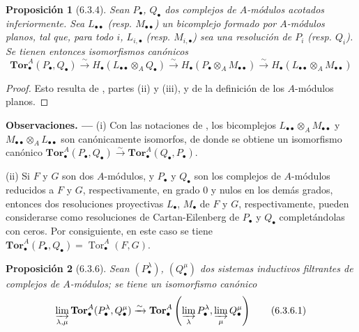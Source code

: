 \documentclass[10pt,oneside,openany]{book}
\makeatletter
\theoremstyle{egaenv}\newtheorem*{env}{---}
\theoremstyle{egastatement}
\newtheorem*{proposition}{Proposición}
\theoremstyle{egadescription}
\newenvironment{namedtheorem}[2][]{\par\medskip\noindent\setmanualcurrentlabel{#1}\textbf{#2\ifstrempty{#1}{}{ (#1)}. ---}\ifstrequal{#2}{Observación}{\normalfont}{\ifstrequal{#2}{Observaciones}{\normalfont}{\itshape}}}{\par\medskip}
\newcommand{\setmanualcurrentlabel}[1]{\def\@currentlabel{#1}}
\makeatother
\begin{document}
\begin{proposition}[6.3.4]
\label{III.6.3.4}
Sean $P_\bullet$, $Q_\bullet$ dos complejos de $A$-módulos acotados
inferiormente. Sea $L_{\bullet\bullet}$ \textup{(resp. $M_{\bullet\bullet}$)} un
bicomplejo formado por $A$-módulos planos, tal que, para todo $i$,
$L_{i,\bullet}$ \textup{(resp. $M_{i,\bullet}$)} sea una resolución de $P_i$
\textup{(resp. $Q_i$)}. Se tienen entonces isomorfismos canónicos
\[
  \mathbf{Tor}_\bullet^A(P_\bullet,Q_\bullet)
  \xrightarrow{\sim}H_\bullet(L_{\bullet\bullet}\otimes_AQ_\bullet)
  \xrightarrow{\sim}H_\bullet(P_\bullet\otimes_AM_{\bullet\bullet})
  \xrightarrow{\sim}H_\bullet(L_{\bullet\bullet}\otimes_AM_{\bullet\bullet})
  \tag{6.3.4.1}\label{III.6.3.4.1.fr}
\]
\end{proposition}

\begin{proof}
Esto resulta de , partes (ii) y (iii), y de la definición
de los
$A$-módulos planos.
\end{proof}

\begin{namedtheorem}[6.3.5]{Observaciones}
\label{III.6.3.5}
(i) Con las notaciones de , los bicomplejos
$L_{\bullet\bullet}\otimes_A M_{\bullet\bullet}$ y
$M_{\bullet\bullet}\otimes_A L_{\bullet\bullet}$ son canónicamente
isomorfos, de donde se obtiene un isomorfismo canónico
$\mathbf{Tor}_\bullet^A(P_\bullet,Q_\bullet)\xrightarrow{\sim}
\mathbf{Tor}_\bullet^A(Q_\bullet,P_\bullet)$.

(ii) Si $F$ y $G$ son dos $A$-módulos, y $P_\bullet$ y $Q_\bullet$ son los
complejos de $A$-módulos reducidos a $F$ y $G$, respectivamente, en grado 0 y
nulos en los demás grados, entonces dos resoluciones proyectivas $L_\bullet$,
$M_\bullet$ de $F$ y $G$, respectivamente, pueden considerarse como
resoluciones de Cartan-Eilenberg de $P_\bullet$ y $Q_\bullet$ completándolas
con ceros. Por consiguiente, en este caso se tiene
$\mathbf{Tor}_\bullet^A(P_\bullet,Q_\bullet)
=\operatorname{Tor}_\bullet^A(F,G)$.
\end{namedtheorem}

\begin{proposition}[6.3.6]
\label{III.6.3.6}
Sean $(P_\bullet^\lambda)$, $(Q_\bullet^\mu)$ dos sistemas inductivos
filtrantes de complejos de $A$-módulos; se tiene un isomorfismo canónico
\[
  \varinjlim_{\lambda,\mu}
  \mathbf{Tor}_\bullet^A(P_\bullet^\lambda,Q_\bullet^\mu)
  \xrightarrow{\sim}
  \mathbf{Tor}_\bullet^A
  \left(\varinjlim_\lambda P_\bullet^\lambda,
        \varinjlim_\mu Q_\bullet^\mu\right)
  \tag{6.3.6.1}\label{III.6.3.6.1.fr}
\]
\end{proposition}
\end{document}

